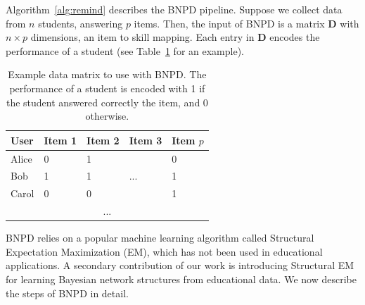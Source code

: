\documentclass{edm_template}
\newcommand{\hl}[1]{\colorbox{yellow}{#1}}
\begin{document}
Algorithm~\ref{alg:remind} describes the BNPD pipeline.
Suppose we collect data from  $n$ students, answering $p$ items.
Then, the input of BNPD is a matrix $\mathbf{D}$ with $n \times p$ dimensions, an item to skill mapping.%
Each entry in $\mathbf{D}$ encodes the performance of a student (see Table~\ref{tbl:d-matrix} for an example).


\begin{table}[htb]%
	\centering
	\caption{Example data matrix to use with BNPD.  The performance of a student is encoded with 1 if the student answered correctly the item, and 0 otherwise. \label{tbl:d-matrix}}
	\begin{tabular}{@{}lllll@{}}
		\toprule
		User  & Item 1 & Item 2 & Item 3 & Item $p$ \\ \midrule
		Alice & 0      & 1      &        & 0        \\
		Bob   & 1      & 1      & ...    & 1        \\
		Carol & 0      & 0      &        & 1        \\
		\multicolumn{5}{c}{...}                     \\ \bottomrule
	\end{tabular}
\end{table}


BNPD relies on a popular machine learning algorithm called Structural Expectation Maximization (EM), which has not been used in educational applications. 
A secondary contribution of our work is introducing Structural EM for learning Bayesian network structures from educational data.
We now describe the  steps of BNPD in detail.
\end{document}
